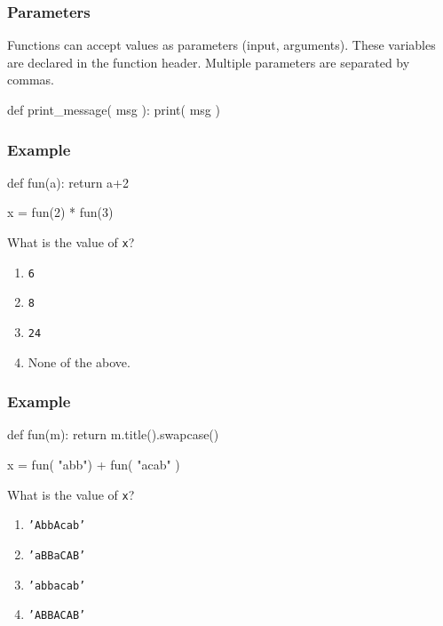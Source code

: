 \documentclass[11pt]{beamer}
\begin{document}
\begin{frame}[fragile]
  \frametitle{Parameters}
  \Enlarge

  \begin{itemize}
  \myitem  Functions can accept values as parameters (input, arguments). \pause
  \myitem  These variables are declared in the function header. \pause
  \myitem  Multiple parameters are separated by commas. \pause
  \end{itemize}
  \begin{semiverbatim}
def print_message( msg ):
    print( msg )
  \end{semiverbatim}
\end{frame}

\begin{frame}[fragile]
  \frametitle{Example}
  \Enlarge

  \begin{semiverbatim}
def fun(a):
    return a+2

x = fun(2) * fun(3)
  \end{semiverbatim}
  What is the value of \texttt{x}?
  \begin{enumerate}[label=\Alph*]
  \item  \texttt{6}
  \item  \texttt{8}
  \item  \texttt{24}
  \item  None of the above.
  \end{enumerate}
\end{frame}

\begin{frame}[fragile]
  \frametitle{Example}
  \Enlarge

  \begin{semiverbatim}
def fun(m):
    return m.title().swapcase()

x = fun( "abb") + fun( "acab" )
  \end{semiverbatim}
  What is the value of \texttt{x}?
  \begin{enumerate}[label=\Alph*]
  \item  \texttt{'AbbAcab'}
  \item  \texttt{'aBBaCAB'}
  \item  \texttt{'abbacab'}
  \item  \texttt{'ABBACAB'}
  \end{enumerate}
\end{frame}
\end{document}
